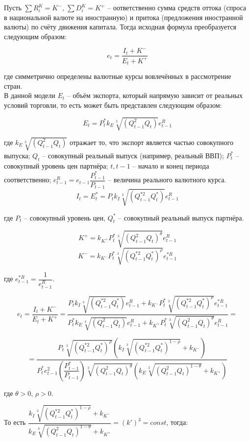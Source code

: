 Пусть $\sum R_i^K = K^-$, $\sum D_i^K = K^+$ -- оответственно сумма средств оттока (спроса в национальной валюте на иностранную) и притока (предложения иностранной валюты) по счёту движения капитала. Тогда исходная формула преобразуется следующим образом:

\[ e_t = \dfrac{I_t + K^-}{E_t + K^+} \]

где симметрично определены валютные курсы вовлечённых в рассмотрение стран.\\

В данной модели $E_t$ -- объём экспорта, который напрямую зависит от реальных условий торговли, то есть может быть представлен следующим образом:

\[ E_t = P_t^* k_E \sqrt[3]{(Q_{t-1}^2 Q_t)} e^R_{t-1} \]

где $k_E \sqrt[3]{(Q_{t-1}^2 Q_t)}$ отражает то, что экспорт является частью совокупного выпуска; $Q_t$ -- совокупный реальный выпуск (например, реальный ВВП); $P^*_t$ -- совокупный уровень цен партнёра; $t, t-1$ -- начало и конец периода соответственно; $e^R_{t-1} = e_{t-1} \dfrac{P^*_{t-1}}{P_{t-1}}$ -- величина реального валютного курса.\\

\[ I_t = E^*_t = P_t k_I \sqrt[3]{(Q_{t-1}^{*2} Q_t^*)} e^{R}_{t-1} \]

где $P_t$ -- совокупный уровень цен, $Q^*_t$ -- совокупный реальный выпуск партнёра.

\[ K^+ = k_{K^+} P^*_t \sqrt[3]{(Q_{t-1}^{2} Q_t)^\theta} e^{R}_{t-1} \]
\[ K^- = k_{K^-} P^*_t \sqrt[3]{(Q_{t-1}^{*2} Q_t^*)^\rho} e^{*R}_{t-1} \]

где $e^{*R}_{t-1} = \dfrac{1}{e^{R}_{t-1}}$.

\[ e_t = \dfrac{I_t + K^-}{E_t + K^+} = \dfrac{P_t k_I \sqrt[3]{(Q_{t-1}^{*2} Q_t^*)} e^{R}_{t-1} + k_{K^-} P^*_t \sqrt[3]{(Q_{t-1}^{*2} Q_t^*)^\rho} e^{*R}_{t-1}}{P_t^* k_E \sqrt[3]{(Q_{t-1}^2 Q_t)} e^R_{t-1} + k_{K^+} P^*_t \sqrt[3]{(Q_{t-1}^{2} Q_t)^\theta} e^{R}_{t-1}}  = \]

\[ = \dfrac{P_t \sqrt[3]{(Q_{t-1}^{*2} Q_t^*)^\rho} \left(k_I \sqrt[3]{(Q_{t-1}^{*2} Q_t^*)^{1 - \rho}} + k_{K^-} \right)}{P_t^* e^2_{t-1}\left( \dfrac{P^*_{t-1}}{P_{t-1}} \right) \sqrt[3]{(Q_{t-1}^{2} Q_t)^\theta} \left( k_E \sqrt[3]{(Q_{t-1}^{2} Q_t)^{1-\theta}} + k_{K^+} \right) } \]

\newpage

где $\theta > 0$, $\rho > 0$.

То есть $\dfrac{k_I \sqrt[3]{(Q_{t-1}^{*2} Q_t^*)^{1 - \rho}} + k_{K^-}}{k_E \sqrt[3]{(Q_{t-1}^{2} Q_t)^{1-\theta}} + k_{K^+}} = (k')^3 = const$, тогда:

